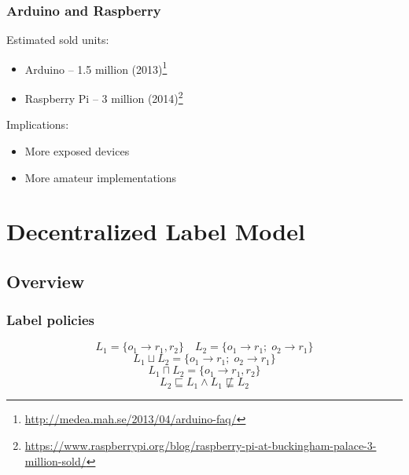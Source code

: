 \documentclass[10pt]{beamer}
\begin{document}
\begin{frame}
  \frametitle{Arduino and Raspberry}
  Estimated sold units:
  \begin{itemize}
    \item Arduino -- 1.5 million (2013)\footnote{\tiny\url{http://medea.mah.se/2013/04/arduino-faq/}}
    \item Raspberry Pi -- 3 million (2014)\footnote{\tiny\url{https://www.raspberrypi.org/blog/raspberry-pi-at-buckingham-palace-3-million-sold/}}
  \end{itemize}
  \vspace{1em}
  Implications:
  \begin{itemize}
    \item More exposed devices
    \item More amateur implementations
  \end{itemize}
\end{frame}

\section[DLM]{Decentralized Label Model}

\subsection{Overview}
\begin{frame}
  \frametitle{Label policies}
  \centering

  \newcommand{\mathvspace}{\\[2em]}
    \[ L_1 = \{ o_1 \rightarrow r_1, r_2 \} \quad L_2 = \{ o_1 \rightarrow r_1 ; \; o_2 \rightarrow r_1 \} \]
    \[ L_1 \sqcup L_2  = \{ o_1 \rightarrow r_1 ; \; o_2 \rightarrow r_1 \} \]
    \[ L_1 \sqcap L_2  = \{ o_1 \rightarrow r_1, r_2 \} \]
    \[ L_2 \sqsubseteq L_1 \land L_1 \not\sqsubseteq L_2 \]
\end{frame}
\end{document}
